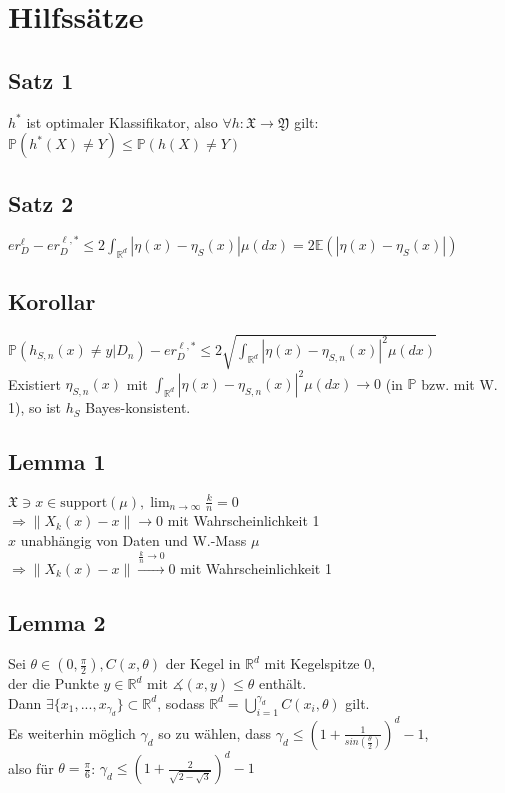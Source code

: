 \documentclass[a4paper,oneside,DIV8,10pt]{scrartcl}
\begin{document}
\section{Hilfss\"atze}
\subsection{Satz 1}
$h^{*}$ ist optimaler Klassifikator, also $\forall h: \mathfrak{X} \to \mathfrak{Y}$ gilt:
	\\ $\mathbb{P}(h^{*}(X) \neq Y) \leq \mathbb{P}(h(X) \neq Y)$

\subsection{Satz 2}
$er^{\ell}_{D} - er^{\ell,*}_{D} \leq 2 \int_{\mathbb{R}^{d}} |\eta(x) - \eta_{S}(x)| \mu(dx) = 2 \mathbb{E}(|\eta(x) - \eta_{S}(x)|)$

\subsection{Korollar}
$\mathbb{P}(h_{S,n}(x) \neq y|D_{n}) - er^{\ell,*}_{D} \leq 2 \sqrt{\int_{\mathbb{R}^{d}} |\eta(x) - \eta_{S,n}(x)|^{2} \mu(dx)}$
\\
\medskip Existiert $\eta_{S,n}(x)$ mit $\int_{\mathbb{R}^{d}} |\eta(x) - \eta_{S,n}(x)|^{2} \mu(dx) \to 0$ (in $\mathbb{P}$ bzw. mit W. 1), so ist $h_{S}$ Bayes-konsistent.

\subsection{Lemma 1}
$\mathfrak{X} \ni x \in \text{support}(\mu), \lim_{n \to \infty} \frac{k}{n} = 0$
\\ $\Rightarrow \|X_{k} (x) - x \| \to 0$ mit Wahrscheinlichkeit 1
\medskip
\\
$x$ unabh\"angig von Daten und W.-Mass $\mu$
\\ $\Rightarrow \|X_{k}(x) - x\| \stackrel{\frac{k}{n} \to 0}{\longrightarrow} 0$ mit Wahrscheinlichkeit 1

\subsection{Lemma 2}
Sei $\theta \in (0, \frac{\pi}{2}), C(x, \theta)$ der Kegel in $\mathbb{R}^{d}$ mit Kegelspitze $0$, 
\\ der die Punkte $y \in \mathbb{R}^{d} \text{ mit } \measuredangle (x,y) \leq \theta$ enth\"alt.
\\ Dann $\exists \{x_{1},...,x_{\gamma_{d}}\} \subset \mathbb{R}^{d}$, sodass
 $ \mathbb{R}^{d} = \bigcup^{\gamma_{d}}_{i=1} C(x_{i}, \theta)$ gilt.
 \\
\medskip Es weiterhin m\"oglich $\gamma_{d}$ so zu w\"ahlen, dass $\gamma_{d} \leq (1 + \frac{1}{sin(\frac{\theta}{2})})^{d} - 1$, 
\\ also f\"ur $\theta = \frac{\pi}{6}$: $\gamma_{d} \leq (1 + \frac{2}{\sqrt{2 - \sqrt{3}}})^{d} - 1$
\end{document}
